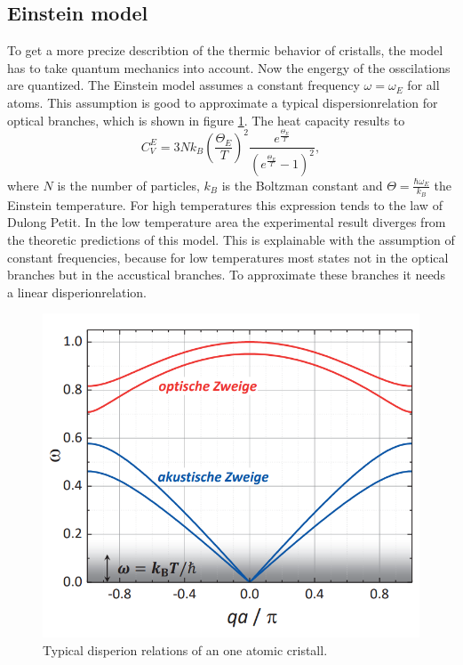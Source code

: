 \subsection{Einstein model}

To get a more precize describtion of the thermic behavior of cristalls, the model has to take quantum mechanics into account. 
Now the engergy of the osscilations are quantized.
The Einstein model assumes a constant frequency $\omega = \omega_E$ for all atoms.
This assumption is good to approximate a typical dispersionrelation for optical branches, which is shown in figure \ref{fig:disperion}. 
The heat capacity results to 
\begin{equation}
    C_V^E = 3 N k_B\left(\frac{\Theta_E}{T}\right)^2\frac{e^{\frac{\Theta_E}{T}}}{\left(e^\frac{\Theta_E}{T}-1\right)^2},
\end{equation}
where $N$ is the number of particles, $k_B$ is the Boltzman constant and $\Theta=\frac{\hbar \omega_E}{k_B}$ the Einstein temperature.
For high temperatures this expression tends to the law of Dulong Petit.
In the low temperature area the experimental result diverges from the theoretic predictions of this model.
This is explainable with the assumption of constant frequencies, because for low temperatures most states not in the optical branches but in the accustical branches.
To approximate these branches it needs a linear disperionrelation.

\begin{figure}
    \centering 
    \includegraphics[width=.8\textwidth]{Bilder/disperion.PNG}
    \caption{Typical disperion relations of an one atomic cristall. \cite[S. 223]{gross2012festkoerperphysik}}
    \label{fig:disperion}
\end{figure}


